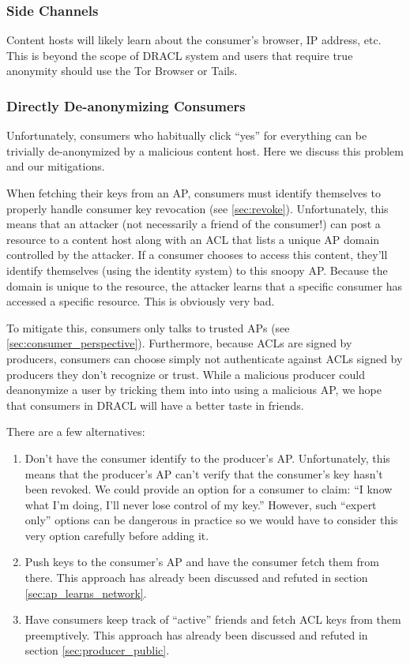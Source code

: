 \documentclass[pdftex,12pt,a4papaer,twoside,notitlepage]{report}
\begin{document}
\subsubsection{Side Channels}

Content hosts will likely learn about the consumer's browser, IP address, etc.
This is beyond the scope of DRACL system and users that require true anonymity
should use the Tor Browser\cite{tor} or Tails\cite{tails}.

\subsubsection{Directly De-anonymizing Consumers}
\label{sec:doxing_consumers}

Unfortunately, consumers who habitually click ``yes'' for everything can be
trivially de-anonymized by a malicious content host. Here we discuss this
problem and our mitigations.

When fetching their keys from an AP, consumers must identify themselves to
properly handle consumer key revocation (see \cref{sec:revoke}). Unfortunately,
this means that an attacker (not necessarily a friend of the consumer!) can post
a resource to a content host along with an ACL that lists a unique AP domain
controlled by the attacker. If a consumer chooses to access this content,
they'll identify themselves (using the identity system) to this snoopy AP.
Because the domain is unique to the resource, the attacker learns that a
specific consumer has accessed a specific resource. This is obviously very bad.

To mitigate this, consumers only talks to trusted APs (see
\cref{sec:consumer_perspective}). Furthermore, because ACLs are signed by
producers, consumers can choose simply not authenticate against ACLs signed by
producers they don't recognize or trust. While a malicious producer could
deanonymize a user by tricking them into into using a malicious AP, we hope that
consumers in DRACL will have a better taste in friends.

There are a few alternatives:

\begin{enumerate}
\item Don't have the consumer identify to the producer's AP. Unfortunately, this
  means that the producer's AP can't verify that the consumer's key hasn't been
  revoked. We could provide an option for a consumer to claim: ``I know what I'm
  doing, I'll never lose control of my key.'' However, such ``expert only''
  options can be dangerous in practice so we would have to consider this very
  option carefully before adding it.
\item Push keys to the consumer's AP and have the consumer fetch them from
  there. This approach has already been discussed and refuted in section
  \cref{sec:ap_learns_network}.
\item Have consumers keep track of ``active'' friends and fetch ACL keys from
  them preemptively. This approach has already been discussed and refuted in
  section \cref{sec:producer_public}.
\end{enumerate}
\end{document}
